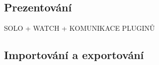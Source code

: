 


\subsection{Prezentování}

SOLO + WATCH + KOMUNIKACE PLUGINŮ

\subsection{Importování a exportování}

